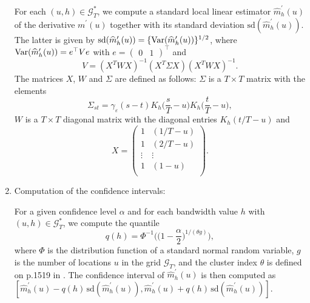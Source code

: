 \begin{enumerate}[leftmargin=0.7cm,label=(\alph*)]
For each $(u,h) \in \mathcal{G}_T^*$, we compute a standard local linear estimator $\widehat{m}^\prime_h(u)$ of the derivative $m^\prime(u)$ together with its standard deviation $\text{sd}(\widehat{m}^\prime_h(u))$. The latter is given by $\text{sd}(\widehat{m}^\prime_h(u)) = \{ \textnormal{Var}(\widehat{m}^\prime_h(u)) \}^{1/2}$, where $\textnormal{Var}(\widehat{m}^\prime_h(u)) = e^\top V e$ with $e = (\begin{matrix} 0 & 1 \end{matrix})^\top$ and 
\[ V = (X^T W X)^{-1} (X^T \Sigma X) (X^T W X)^{-1}. \]
The matrices $X$, $W$ and $\Sigma$ are defined as follows: $\Sigma$ is a $T \times T$ matrix with the elements
\[ \Sigma_{st} = \gamma_\varepsilon(s-t) K_h\Big( \frac{s}{T} - u \Big) K_h\Big( \frac{t}{T} - u \Big), \]
$W$ is a $T \times T$ diagonal matrix with the diagonal entries $K_h(t/T-u)$ and 
\[ X =   
\begin{pmatrix}
1 & (1/T - u)   \\
1 & (2/T - u)   \\
\vdots & \vdots \\
1 & (1 - u)     \\
\end{pmatrix}. \]

\item Computation of the confidence intervals:  

For a given confidence level $\alpha$ and for each bandwidth value $h$ with $(u,h) \in \mathcal{G}_T^*$, we compute the quantile 
\[ q(h) = \Phi^{-1} \Big( \Big( 1 - \frac{\alpha}{2} \Big)^{1/(\theta g)} \Big), \]
where $\Phi$ is the distribution function of a standard normal random variable, $g$ is the number of locations $u$ in the grid $\mathcal{G}_T$, and the cluster index $\theta$ is defined on p.1519 in \cite{ParkHannigKang2009}. The confidence interval of $\widehat{m}^\prime_h(u)$ is then computed as $[\widehat{m}^\prime_h(u) - q(h) \, \text{sd}(\widehat{m}^\prime_h(u)),\widehat{m}^\prime_h(u) + q(h) \, \text{sd}(\widehat{m}^\prime_h(u))]$. 


\end{enumerate}


